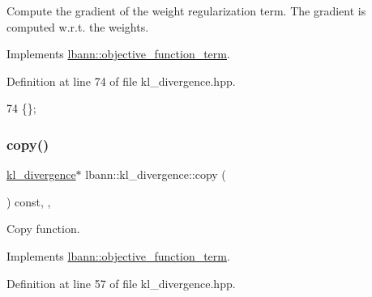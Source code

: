Compute the gradient of the weight regularization term. The gradient is computed w.\+r.\+t. the weights. 

Implements \hyperlink{classlbann_1_1objective__function__term_a134cf89caed45527bbe9d811a0b93dfc}{lbann\+::objective\+\_\+function\+\_\+term}.



Definition at line 74 of file kl\+\_\+divergence.\+hpp.


\begin{DoxyCode}
74 \{\};
\end{DoxyCode}
\mbox{\label{classlbann_1_1kl__divergence_aa0265eb9f1cff77d4101137b09f87353}} 
\subsubsection{\texorpdfstring{copy()}{copy()}}
{\footnotesize\ttfamily \hyperlink{classlbann_1_1kl__divergence}{kl\+\_\+divergence}$\ast$ lbann\+::kl\+\_\+divergence\+::copy (\begin{DoxyParamCaption}{ }\end{DoxyParamCaption}) const\hspace{0.3cm}{\ttfamily [inline]}, {\ttfamily [override]}, {\ttfamily [virtual]}}

Copy function. 

Implements \hyperlink{classlbann_1_1objective__function__term_ae98a4ec173a602ad55d1df20dadd4cb9}{lbann\+::objective\+\_\+function\+\_\+term}.



Definition at line 57 of file kl\+\_\+divergence.\+hpp.


